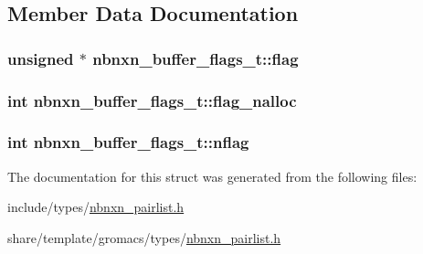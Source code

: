 \subsection{\-Member \-Data \-Documentation}
\hypertarget{structnbnxn__buffer__flags__t_a8a425dfc66fbd6f1f165a18a20a4fbbe}{
\subsubsection[{flag}]{\setlength{\rightskip}{0pt plus 5cm}unsigned $\ast$ {\bf nbnxn\-\_\-buffer\-\_\-flags\-\_\-t\-::flag}}}\label{structnbnxn__buffer__flags__t_a8a425dfc66fbd6f1f165a18a20a4fbbe}
\hypertarget{structnbnxn__buffer__flags__t_a15c43e07c6629d40d3388da173ca4943}{
\subsubsection[{flag\-\_\-nalloc}]{\setlength{\rightskip}{0pt plus 5cm}int {\bf nbnxn\-\_\-buffer\-\_\-flags\-\_\-t\-::flag\-\_\-nalloc}}}\label{structnbnxn__buffer__flags__t_a15c43e07c6629d40d3388da173ca4943}
\hypertarget{structnbnxn__buffer__flags__t_a7ebdb89f01264982c53be650ec393f95}{
\subsubsection[{nflag}]{\setlength{\rightskip}{0pt plus 5cm}int {\bf nbnxn\-\_\-buffer\-\_\-flags\-\_\-t\-::nflag}}}\label{structnbnxn__buffer__flags__t_a7ebdb89f01264982c53be650ec393f95}


\-The documentation for this struct was generated from the following files\-:\begin{DoxyCompactItemize}
\item 
include/types/\hyperlink{include_2types_2nbnxn__pairlist_8h}{nbnxn\-\_\-pairlist.\-h}\item 
share/template/gromacs/types/\hyperlink{share_2template_2gromacs_2types_2nbnxn__pairlist_8h}{nbnxn\-\_\-pairlist.\-h}\end{DoxyCompactItemize}

